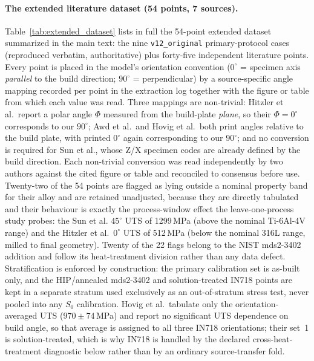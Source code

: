 \documentclass[12pt,a4paper,twocolumn]{article}
\providecommand{\ang}[1]{\ensuremath{#1^{\circ}}}
\begin{document}
\paragraph{The extended literature dataset (54 points, 7 sources).} Table~\ref{tab:extended_dataset} lists in
full the 54-point extended dataset summarized in the main text: the nine \texttt{v12\_original} primary-protocol
cases (reproduced verbatim, authoritative) plus forty-five independent literature points. Every point is placed
in the model's orientation convention ($\ang{0}$ = specimen axis \emph{parallel} to the build direction;
$\ang{90}$ = perpendicular) by a source-specific angle mapping recorded per point in the extraction log together
with the figure or table from which each value was read. Three mappings are non-trivial: Hitzler et al.\ report a
polar angle $\Phi$ measured from the build-plate \emph{plane}, so their $\Phi = 0^\circ$ corresponds to our
$\ang{90}$; Awd et al.\ and Hovig et al.\ both print angles relative to the build plate, with printed $0^\circ$
again corresponding to our $\ang{90}$; and no conversion is required for Sun et al., whose Z/X specimen codes are
already defined by the build direction. Each non-trivial conversion was read independently by two authors against
the cited figure or table and reconciled to consensus before use. Twenty-two of the 54 points are flagged as lying
outside a nominal property band for their alloy and are retained unadjusted, because they are directly tabulated
and their behaviour is exactly the process-window effect the leave-one-process study probes: the Sun et al.
$\ang{45}$ UTS of 1299\,MPa (above the nominal Ti-6Al-4V range) and the Hitzler et al.\ $\ang{0}$ UTS of 512\,MPa
(below the nominal 316L range, milled to final geometry). Twenty of the 22 flags belong to the NIST mds2-3402
addition and follow its heat-treatment division rather than any data defect. Stratification is enforced by
construction: the primary calibration set is as-built only, and the HIP/annealed mds2-3402 and solution-treated
IN718 points are kept in a separate stratum used exclusively as an out-of-stratum stress test, never pooled into
any $S_0$ calibration. Hovig et al.\ tabulate only the orientation-averaged UTS ($970\pm74$\,MPa) and report no
significant UTS dependence on build angle, so that average is assigned to all three IN718 orientations; their
set~1 is solution-treated, which is why IN718 is handled by the declared cross-heat-treatment diagnostic below
rather than by an ordinary source-transfer fold.
\end{document}
